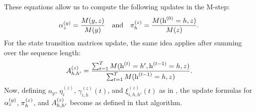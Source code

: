 \endgroup
These equations allow us to compute the following updates in the M-step:
\begin{align}
	{\alpha}^{(y)}_z = \frac{M(y,z)}{M(y)} \quad \text{and} \quad {\pi}^{(z)}_h = \frac{M({\textnormal{h}}^{(0)}=h, z)}{M(z)}.
\end{align}
For the state transition matrices update, the same idea applies after summing over the sequence length:
\begin{equation}
	{A}^{(z)}_{h,h'} = \frac{\sum_{t=1}^T M({\textnormal{h}}^{(t)}=h', {\textnormal{h}}^{(t-1)}=h, z)}{\sum_{t=1}^T M({\textnormal{h}}^{(t-1)}=h, z)}.
\end{equation}
Now, defining $n_y$, $\eta^{(z)}_i$, $\gamma^{(z)}_{i,h}(t)$, and $\xi^{(z)}_{i,h,h'}(t)$ as in , the update formulas for ${\alpha}^{(y)}_z$, ${\pi}^{(z)}_h$, and ${A}^{(z)}_{h,h'}$ become as defined in that algorithm.

